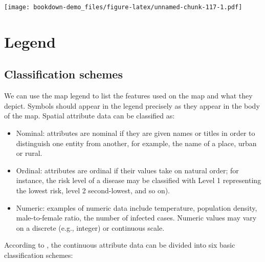 \documentclass[]{book}
\begin{document}
\texttt{[image: bookdown-demo\_files/figure-latex/unnamed-chunk-117-1.pdf]}

\section{Legend}\label{legend-1}

\subsection{Classification schemes}\label{classification-schemes}

We can use the map legend to list the features used on the map and what
they depict. Symbols should appear in the legend precisely as they
appear in the body of the map. Spatial attribute data can be classified
as:

\begin{itemize}
\item
  Nominal: attributes are nominal if they are given names or titles in
  order to distinguish one entity from another, for example, the name of
  a place, urban or rural.
\item
  Ordinal: attributes are ordinal if their values take on natural order;
  for instance, the risk level of a disease may be classified with Level
  1 representing the lowest risk, level 2 second-lowest, and so on).
\item
  Numeric: examples of numeric data include temperature, population
  density, male-to-female ratio, the number of infected cases. Numeric
  values may vary on a discrete (e.g., integer) or continuous scale.
\end{itemize}

According to \citet{pfeiffer2008spatial}, the continuous attribute data
can be divided into six basic classification schemes:
\end{document}
